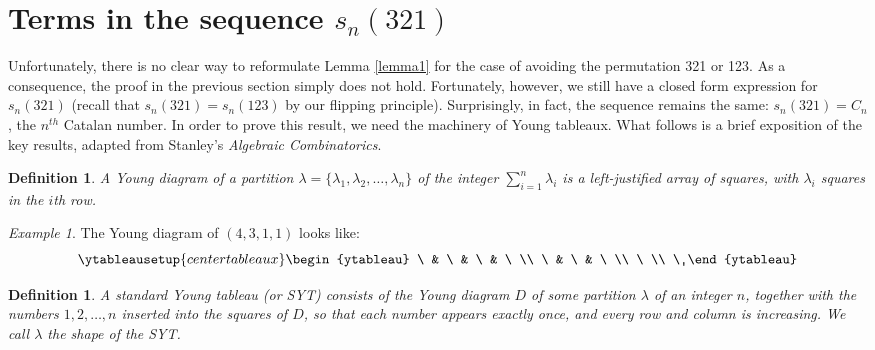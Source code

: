 \documentclass[11pt,letterpaper,twoside,english]{article}
\theoremstyle{theorem}
\newtheorem{definition}[theorem]{Definition}
\theoremstyle{remark}
\newtheorem{example}{Example}
\begin{document}
\section{Terms in the sequence $s_n(321)$}

\label{321}
Unfortunately, there is no clear way to reformulate Lemma \ref{lemma1} for the case of avoiding the permutation 321 or 123. As a consequence, the proof in the previous section simply does not hold. Fortunately, however, we still have a closed form expression for $s_n(321)$ (recall that $s_n(321)=s_n(123)$ by our flipping principle). Surprisingly, in fact, the sequence remains the same: $s_n(321)=C_n$, the $n^{th}$ Catalan number. In order to prove this result, we need the machinery of Young tableaux. What follows is a brief exposition of the key results, adapted from Stanley's \emph{Algebraic Combinatorics}.

\begin{definition}
A Young diagram of a partition $\lambda=\{\lambda_1, \lambda_2, \ldots, \lambda_n\}$ of the integer $\sum_{i=1}^n \lambda_i$ is a left-justified array of squares, with $\lambda_i$ squares in the $i$th row.
\end{definition}
\begin{example}
The Young diagram of $(4, 3, 1, 1)$ looks like:
\[
\ytableausetup{centertableaux}
\begin{ytableau}
\ & \ & \ & \ \\
\ & \ & \ \\
\ \\
\
\end{ytableau}
\]
\end{example}

\begin{definition}
A standard Young tableau (or SYT) consists of the Young diagram $D$ of some partition $\lambda$ of an integer $n$, together with the numbers $1, 2, \ldots, n$ inserted into the squares of $D$, so that each number appears exactly once, and every row and column is \emph{increasing}. We call $\lambda$ the \emph{shape} of the SYT.
\end{definition}
\end{document}

